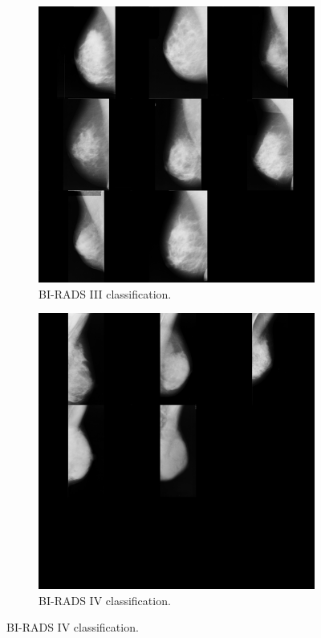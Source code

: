 \begin{figure}[H]
    \begin{subfigure}[t]{0.3\textwidth}
      \includegraphics[width=\textwidth]{Appendix5/sample3/big_scan_sample3.png}
      \caption{BI-RADS III classification.}
      \label{fig:app-sample3-input}
    \end{subfigure}
    \begin{subfigure}[t]{0.3\textwidth}
      \includegraphics[width=\textwidth]{Appendix5/sample4/big_scan_sample4.png}
      \caption{BI-RADS IV classification.}
      \label{fig:app-sample4-input}
    \end{subfigure}
\end{figure}

